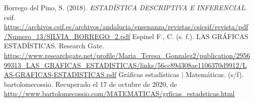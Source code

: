 \documentclass[12pt]{article}
\begin{document}
\newpage
\begin{thebibliography}{X}
	 Borrego del Pino, S. (2018). \textit{ESTADÍSTICA DESCRIPTIVA E INFERENCIAL}. csif. \url{https://archivos.csif.es/archivos/andalucia/ensenanza/revistas/csicsif/revista/pdf/Numero_13/SILVIA_BORREGO_2.pdf}
	 Espinel F., C. (s. f.). LAS GRÁFICAS ESTAD\'ISTICAS. Research Gate. \url{https://www.researchgate.net/profile/Maria_Teresa_Gonzalez2/publication/295699313_LAS_GRAFICAS_ESTADISTICAS/links/56cc89d308ae1106370d9912/LAS-GRAFICAS-ESTADISTICAS.pdf}
	 Gráficas estadísticas $|$ Matemáticas. (s/f). bartolomecossio. Recuperado el 17 de octubre de 2020, de \url{http://www.bartolomecossio.com/MATEMATICAS/grficas_estadsticas.html}

\end{thebibliography}
\end{document}
